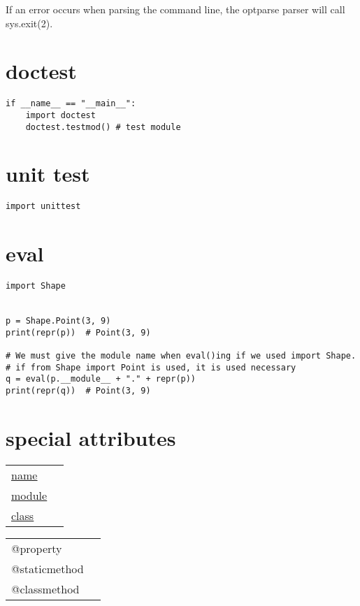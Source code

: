 \documentclass[11pt]{article}
\begin{document}
If an error occurs when parsing the command line, the optparse parser will call sys.exit(2). \\
\section{doctest}
\label{sec-32}
\begin{verbatim}
if __name__ == "__main__":
    import doctest
    doctest.testmod() # test module
\end{verbatim}
\section{unit test}
\label{sec-33}
\begin{verbatim}
import unittest
\end{verbatim}
\section{eval}
\label{sec-34}
\begin{verbatim}
import Shape


p = Shape.Point(3, 9)
print(repr(p))  # Point(3, 9)

# We must give the module name when eval()ing if we used import Shape.
# if from Shape import Point is used, it is used necessary
q = eval(p.__module__ + "." + repr(p))
print(repr(q))  # Point(3, 9)
\end{verbatim}

\section{special attributes}
\label{sec-35}
\begin{center}
\begin{tabular}{ll}
\uline{\uline{name}} & \\
\uline{\uline{module}} & \\
\uline{\uline{class}} & \\
\end{tabular}
\end{center}

\begin{center}
\begin{tabular}{ll}
@property & \\
@staticmethod & \\
@classmethod & \\
\end{tabular}
\end{center}
\end{document}
